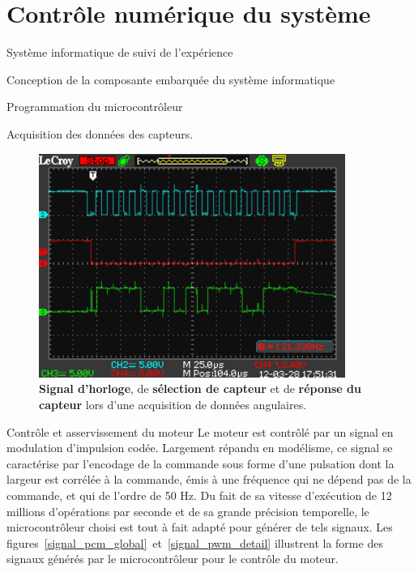 \documentclass[a4paper,twoside,12pt]{article}
\newcounter{partie}
\newcounter{sous-partie}
\newenvironment{partie}[1]
{
\section{#1}
}
{

}
\newenvironment{sous-partie}[1]
{
\subsection{#1}
}
{

}
\newenvironment{sous-sous-partie}[1]
{
\subsubsection{#1}
}
{

}
\begin{document}
\begin{partie}{Contrôle numérique du système}
\begin{sous-partie}{Système informatique de suivi de l'expérience}
\begin{sous-sous-partie}{Conception de la composante embarquée du système informatique}
\begin{paragraph}{Programmation du microcontrôleur\vspace{0.3cm}\\}
\begin{subparagraph}{Acquisition des données des capteurs.}
\begin{figure}[!h]
	\centering
	\includegraphics[width=10cm]{./images/protocole_capteur_oscillo.png}
	\caption{\textbf{\color{Cerulean}Signal d'horloge}, de \textbf{\color{Red}sélection de capteur} et de \textbf{\color{ForestGreen}réponse du capteur} lors d'une acquisition de données angulaires.}
	\label{protocole_capteur_oscillo}
\end{figure}

\end{subparagraph}

\begin{subparagraph}{Contrôle et asservissement du moteur}
Le moteur est contrôlé par un signal en modulation d'impulsion codée. %
Largement répandu en modélisme, ce signal se caractérise par l'encodage de la commande sous forme d'une pulsation dont la largeur est corrélée à la commande, émis à une fréquence qui ne dépend pas de la commande, et qui de l'ordre de 50 Hz. %
Du fait de sa vitesse d'exécution de 12 millions d'opérations par seconde et de sa grande précision temporelle, le microcontrôleur choisi est tout à fait adapté pour générer de tels signaux. %
Les figures~\ref{signal_pcm_global}~et~\ref{signal_pwm_detail} illustrent la forme des signaux générés par le microcontrôleur pour le contrôle du moteur. %


\newlength{\largeurphotooscillo}
\setlength{\largeurphotooscillo}{\textwidth}
\addtolength{\largeurphotooscillo}{-0,6cm}
\setlength{\largeurphotooscillo}{\largeurphotooscillo/2}


\end{subparagraph}
\end{paragraph}
\end{sous-sous-partie}
\end{sous-partie}
\end{partie}
\end{document}

